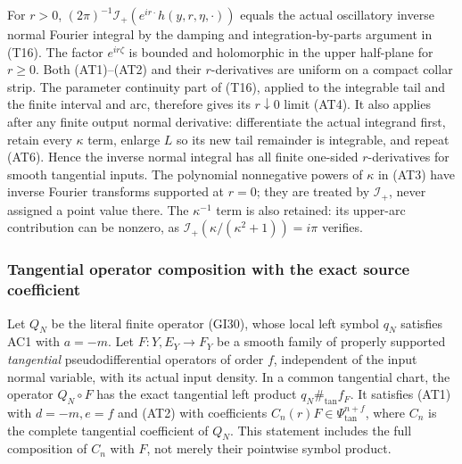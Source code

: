 \documentclass[
  11pt,
]{article}
\begin{document}
For \(r>0\), \((2\pi)^{-1}\mathcal I_+(e^{ir\cdot}h(y,r,\eta,\cdot))\)
equals the actual oscillatory inverse normal Fourier integral by the
damping and integration-by-parts argument in (T16). The factor
\(e^{ir\zeta}\) is bounded and holomorphic in the upper half-plane for
\(r\geq0\). Both (AT1)--(AT2) and their \(r\)-derivatives are uniform on
a compact collar strip. The parameter continuity part of (T16), applied
to the integrable tail and the finite interval and arc, therefore gives
its \(r\downarrow0\) limit (AT4). It also applies after any finite
output normal derivative: differentiate the actual integrand first,
retain every \(\kappa\) term, enlarge \(L\) so its new tail remainder is
integrable, and repeat (AT6). Hence the inverse normal integral has all
finite one-sided \(r\)-derivatives for smooth tangential inputs. The
polynomial nonnegative powers of \(\kappa\) in (AT3) have inverse
Fourier transforms supported at \(r=0\); they are treated by
\(\mathcal I_+\), never assigned a point value there. The
\(\kappa^{-1}\) term is also retained: its upper-arc contribution can be
nonzero, as \(\mathcal I_+(\kappa/(\kappa^2+1))=i\pi\) verifies.

\subsubsection{Tangential operator composition with the exact source
coefficient}\label{tangential-operator-composition-with-the-exact-source-coefficient}

Let \(Q_N\) be the literal finite operator (GI30), whose local left
symbol \(q_N\) satisfies AC1 with \(a=-m\). Let \(F:Y,E_Y\to F_Y\) be a
smooth family of properly supported \emph{tangential} pseudodifferential
operators of order \(f\), independent of the input normal variable, with
its actual input density. In a common tangential chart, the operator
\(Q_N\circ F\) has the exact tangential left product
\(q_N\#_{\mathrm{tan}} f_F\). It satisfies (AT1) with \(d=-m,e=f\) and
(AT2) with coefficients \(C_n(r)F\in\Psi_{\mathrm{tan}}^{n+f}\), where
\(C_n\) is the complete tangential coefficient of \(Q_N\). This
statement includes the full composition of \(C_n\) with \(F\), not
merely their pointwise symbol product.
\end{document}
